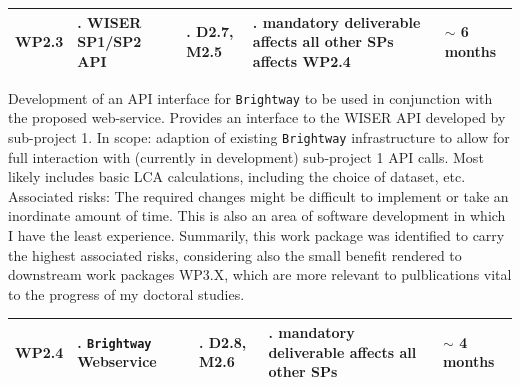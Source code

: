 \documentclass{article}
\begin{document}
    \begin{table}[H]
        \centering
        \begin{tabularx}{\linewidth}{
            |>{\hsize=0.25\hsize}X
            |>{\hsize=1.\hsize}X
            |>{\hsize=1.\hsize}X
            |>{\hsize=1.\hsize}X
            |>{\hsize=0.75\hsize}X|
          } %
            \hline
                WP2.3
            &
                WISER SP1/SP2 API
            &
                D2.7, M2.5
            &
                mandatory deliverable \newline affects all other SPs \newline affects WP2.4
            &
                $\sim$ 6 months
            \\
            \hline
        \end{tabularx}
    \end{table}
    \vspace*{-9pt}
    
    Development of an API interface for \texttt{Brightway} to be used in conjunction with the proposed web-service. Provides an interface to the WISER API developed by sub-project 1. In scope: adaption of existing \texttt{Brightway} infrastructure to allow for full interaction with (currently in development) sub-project 1 API calls. Most likely includes basic LCA calculations, including the choice of dataset, etc. Associated risks: The required changes might be difficult to implement or take an inordinate amount of time. This is also an area of software development in which I have the least experience. Summarily, this work package was identified to carry the highest associated risks, considering also the small benefit rendered to downstream work packages WP3.X, which are more relevant to pulblications vital to the progress of my doctoral studies.
    
    \begin{table}[H]
        \centering
        \begin{tabularx}{\linewidth}{
            |>{\hsize=0.25\hsize}X
            |>{\hsize=1.\hsize}X
            |>{\hsize=1.\hsize}X
            |>{\hsize=1.\hsize}X
            |>{\hsize=0.75\hsize}X|
          } %
            \hline
                WP2.4
            &
                \texttt{Brightway} Webservice
            &
                D2.8, M2.6
            &
                mandatory deliverable \newline affects all other SPs 
            &
                $\sim$ 4 months
            \\
            \hline
        \end{tabularx}
    \end{table}
    \vspace*{-9pt}
    
\end{document}
